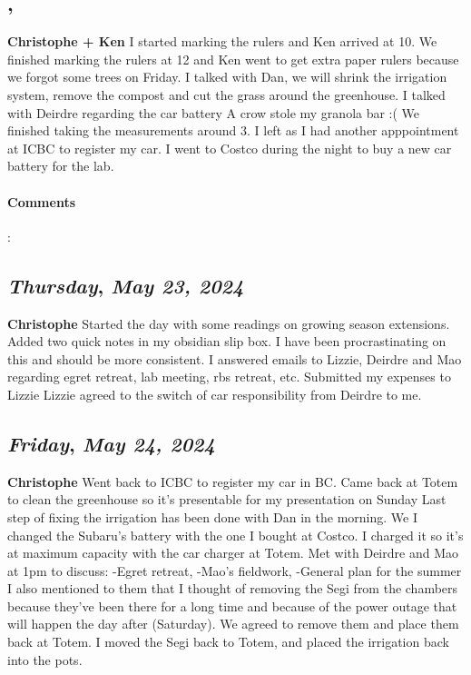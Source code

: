 \subsection*{\weekday, \day}
\textbf{Christophe + Ken}
I started marking the rulers and Ken arrived at 10. 
We finished marking the rulers at 12 and Ken went to get extra paper rulers because we forgot some trees on Friday. 
I talked with Dan, we will shrink the irrigation system, remove the compost and cut the grass around the greenhouse. 
I talked with Deirdre regarding the car battery 
A crow stole my granola bar :(
We finished taking the measurements around 3. I left as I had another apppointment at ICBC to register my car. 
I went to Costco during the night to buy a new car battery for the lab.
\paragraph{Comments}:

\def\day{\textit{May 23, 2024}}
\def\weekday{\textit{Thursday}}
\subsection*{\weekday, \day}
\textbf{Christophe}
Started the day with some readings on growing season extensions. 
Added two quick notes in my obsidian slip box. I have been procrastinating on this and should be more consistent.
I answered emails to Lizzie, Deirdre and Mao regarding egret retreat, lab meeting, rbs retreat, etc.
Submitted my expenses to Lizzie
Lizzie agreed to the switch of car responsibility from Deirdre to me. 

\def\day{\textit{May 24, 2024}}
\def\weekday{\textit{Friday}}
\subsection*{\weekday, \day}
\textbf{Christophe }
Went back to ICBC to register my car in BC.
Came back at Totem to clean the greenhouse so it's presentable for my presentation on Sunday
Last step of fixing the irrigation has been done with Dan in the morning. We 
I changed the Subaru's battery with the one I bought at Costco. I charged it so it's at maximum capacity with the car charger at Totem.
Met with Deirdre and Mao at 1pm to discuss:
-Egret retreat, -Mao's fieldwork, -General plan for the summer
I also mentioned to them that I thought of removing the Segi from the chambers because they've been there for a long time and because of the power outage that will happen the day after (Saturday). We agreed to remove them and place them back at Totem.
I moved the Segi back to Totem, and placed the irrigation back into the pots.

